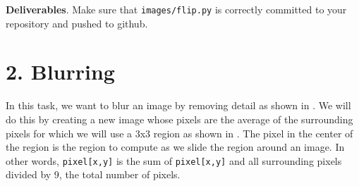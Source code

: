 \begin{callout}{\bcplume}
{\bf Deliverables}. Make sure that {\tt images/flip.py} is correctly committed to your repository and pushed to github.
\end{callout}

\section{2. Blurring}

In this task, we want to blur an image by removing detail as shown in . We will do this by creating a new image whose pixels are the average of the surrounding pixels for which we will use a 3x3 region as shown in . The pixel in the center of the region is the region to compute as we slide the region around an image. In other words, {\tt pixel[x,y]} is the sum of {\tt pixel[x,y]} and all surrounding pixels divided by 9, the total number of pixels.

\begin{marginfigure}
\begin{center}
\\
\end{center}
\label{blur}
\end{marginfigure}

